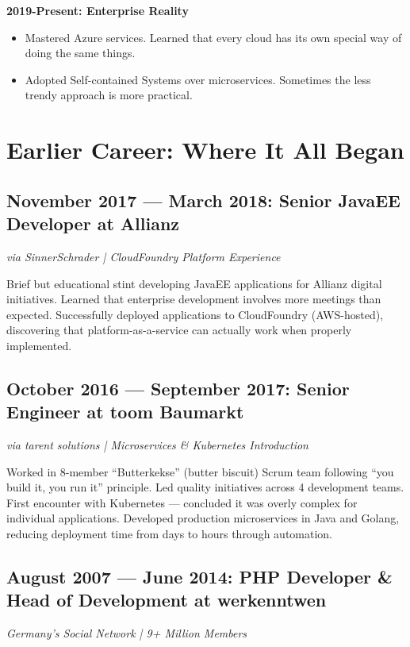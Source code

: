 \documentclass[11pt,a4paper]{article}
\begin{document}
\textbf{2019-Present: Enterprise Reality}
\begin{itemize}[nosep,leftmargin=1.5em]
    \item Mastered Azure services. Learned that every cloud has its own special way of doing the same things.
    \item Adopted Self-contained Systems over microservices. Sometimes the less trendy approach is more practical.
\end{itemize}

\newpage

\section*{Earlier Career: Where It All Began}

\subsection*{November 2017 --- March 2018: Senior JavaEE Developer at Allianz}
\textit{via SinnerSchrader | CloudFoundry Platform Experience}

Brief but educational stint developing JavaEE applications for Allianz digital initiatives. Learned that enterprise development involves more meetings than expected. Successfully deployed applications to CloudFoundry (AWS-hosted), discovering that platform-as-a-service can actually work when properly implemented.

\subsection*{October 2016 --- September 2017: Senior Engineer at toom Baumarkt}
\textit{via tarent solutions | Microservices \& Kubernetes Introduction}

Worked in 8-member ``Butterkekse'' (butter biscuit) Scrum team following ``you build it, you run it'' principle. Led quality initiatives across 4 development teams. First encounter with Kubernetes --- concluded it was overly complex for individual applications. Developed production microservices in Java and Golang, reducing deployment time from days to hours through automation.

\subsection*{August 2007 --- June 2014: PHP Developer \& Head of Development at werkenntwen}
\textit{Germany's Social Network | 9+ Million Members}
\end{document}
